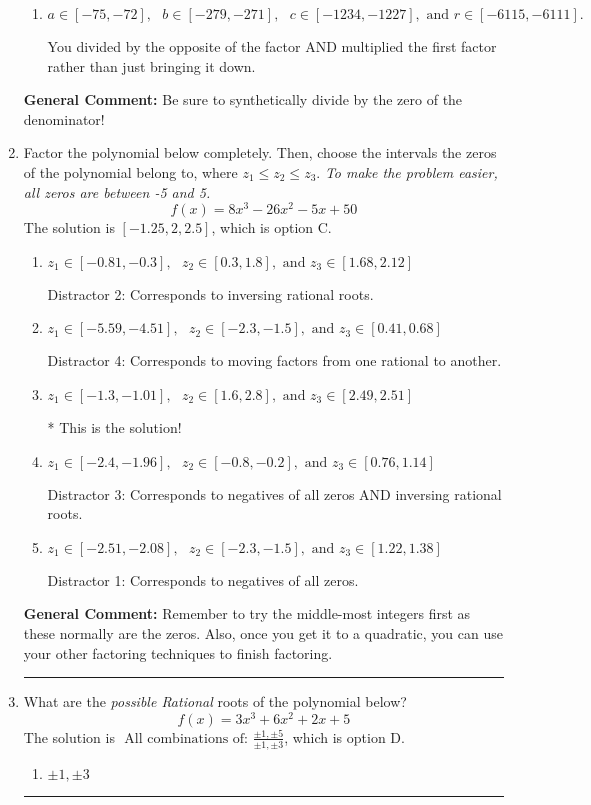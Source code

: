 \documentclass{extbook}[14pt]
\newcommand{\litem}[1]{\item #1

\rule{\textwidth}{0.4pt}}
\begin{document}
\begin{enumerate}
{\begin{enumerate}[label=\Alph*.]
* This is the solution!
\item \( a \in [-75, -72], \text{   } b \in [-279, -271], \text{   } c \in [-1234, -1227], \text{   and   } r \in [-6115, -6111]. \)

 You divided by the opposite of the factor AND multiplied the first factor rather than just bringing it down.
\end{enumerate}

\textbf{General Comment:} Be sure to synthetically divide by the zero of the denominator!
}
\litem{
Factor the polynomial below completely. Then, choose the intervals the zeros of the polynomial belong to, where $z_1 \leq z_2 \leq z_3$. \textit{To make the problem easier, all zeros are between -5 and 5.}
\[ f(x) = 8x^{3} -26 x^{2} -5 x + 50 \]The solution is \( [-1.25, 2, 2.5] \), which is option C.\begin{enumerate}[label=\Alph*.]
\item \( z_1 \in [-0.81, -0.3], \text{   }  z_2 \in [0.3, 1.8], \text{   and   } z_3 \in [1.68, 2.12] \)

 Distractor 2: Corresponds to inversing rational roots.
\item \( z_1 \in [-5.59, -4.51], \text{   }  z_2 \in [-2.3, -1.5], \text{   and   } z_3 \in [0.41, 0.68] \)

 Distractor 4: Corresponds to moving factors from one rational to another.
\item \( z_1 \in [-1.3, -1.01], \text{   }  z_2 \in [1.6, 2.8], \text{   and   } z_3 \in [2.49, 2.51] \)

* This is the solution!
\item \( z_1 \in [-2.4, -1.96], \text{   }  z_2 \in [-0.8, -0.2], \text{   and   } z_3 \in [0.76, 1.14] \)

 Distractor 3: Corresponds to negatives of all zeros AND inversing rational roots.
\item \( z_1 \in [-2.51, -2.08], \text{   }  z_2 \in [-2.3, -1.5], \text{   and   } z_3 \in [1.22, 1.38] \)

 Distractor 1: Corresponds to negatives of all zeros.
\end{enumerate}

\textbf{General Comment:} Remember to try the middle-most integers first as these normally are the zeros. Also, once you get it to a quadratic, you can use your other factoring techniques to finish factoring.
}
\litem{
What are the \textit{possible Rational} roots of the polynomial below?
\[ f(x) = 3x^{3} +6 x^{2} +2 x + 5 \]The solution is \( \text{ All combinations of: }\frac{\pm 1,\pm 5}{\pm 1,\pm 3} \), which is option D.\begin{enumerate}[label=\Alph*.]
\item \( \pm 1,\pm 3 \)


\end{enumerate}}
\end{enumerate}
\end{document}
